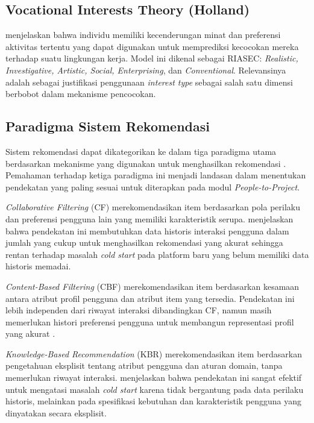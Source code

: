 \subsection{Vocational Interests Theory (Holland)}

\textcite{holland1959} menjelaskan bahwa individu memiliki kecenderungan minat dan preferensi aktivitas tertentu yang dapat digunakan untuk memprediksi kecocokan mereka terhadap suatu lingkungan kerja. Model ini dikenal sebagai RIASEC: \emph{Realistic, Investigative, Artistic, Social, Enterprising}, dan \emph{Conventional}. Relevansinya adalah sebagai justifikasi penggunaan \emph{interest type} sebagai salah satu dimensi berbobot dalam mekanisme pencocokan.

\subsection{Paradigma Sistem Rekomendasi}

Sistem rekomendasi dapat dikategorikan ke dalam tiga paradigma utama berdasarkan mekanisme yang digunakan untuk menghasilkan rekomendasi \autocite{ricci2011}. Pemahaman terhadap ketiga paradigma ini menjadi landasan dalam menentukan pendekatan yang paling sesuai untuk diterapkan pada modul \emph{People-to-Project}.

\emph{Collaborative Filtering} (CF) merekomendasikan item berdasarkan pola perilaku dan preferensi pengguna lain yang memiliki karakteristik serupa. \textcite{adomavicius2005} menjelaskan bahwa pendekatan ini membutuhkan data historis interaksi pengguna dalam jumlah yang cukup untuk menghasilkan rekomendasi yang akurat sehingga rentan terhadap masalah \emph{cold start} pada platform baru yang belum memiliki data historis memadai.

\emph{Content-Based Filtering} (CBF) merekomendasikan item berdasarkan kesamaan antara atribut profil pengguna dan atribut item yang tersedia. Pendekatan ini lebih independen dari riwayat interaksi dibandingkan CF, namun masih memerlukan histori preferensi pengguna untuk membangun representasi profil yang akurat \autocite{ricci2011}.

\emph{Knowledge-Based Recommendation} (KBR) merekomendasikan item berdasarkan pengetahuan eksplisit tentang atribut pengguna dan aturan domain, tanpa memerlukan riwayat interaksi. \textcite{burke2002} menjelaskan bahwa pendekatan ini sangat efektif untuk mengatasi masalah \emph{cold start} karena tidak bergantung pada data perilaku historis, melainkan pada spesifikasi kebutuhan dan karakteristik pengguna yang dinyatakan secara eksplisit.

